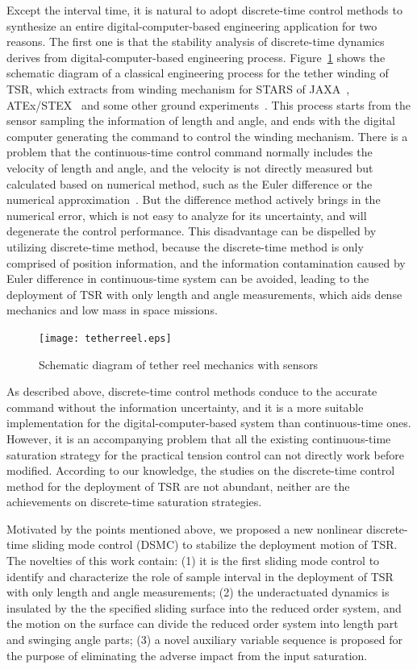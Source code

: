 \documentclass[10pt,onecolumn,draftcls]{IEEEtran}
\begin{document}
Except the interval time, it is natural to adopt discrete-time control methods to synthesize an entire digital-computer-based engineering application for two reasons. The first one is that the stability analysis of discrete-time dynamics derives from digital-computer-based engineering process. Figure~\ref{fig:tetherreel} shows the schematic diagram of a classical engineering process for the tether winding of TSR, which extracts from winding mechanism for STARS of JAXA~\cite{Nohmi2009}, ATEx/STEX~\cite{Gates2001} and some other ground experiments~\cite{Iki2014,Nakaya2004}. This process starts from the sensor sampling the information of length and angle, and ends with the digital computer generating the command to control the winding mechanism. There is a problem that the continuous-time control command normally includes the velocity of length and angle,  and the velocity is not directly measured but calculated based on numerical method, such as the Euler difference or the numerical approximation~\cite{Kang2018}. But the difference method actively brings in the numerical error, which is not easy to analyze for its uncertainty, and will degenerate the control performance. 
This disadvantage can be dispelled by utilizing discrete-time method, because the discrete-time method is only comprised of position information, and the information contamination caused by Euler difference in continuous-time system can be avoided, leading to the deployment of TSR with only length and angle measurements, which aids dense mechanics and low mass in space missions. 
\begin{figure}[htbp]  
	\centering
\texttt{[image: tetherreel.eps]}
\caption{Schematic diagram of tether reel mechanics with sensors} \label{fig:tetherreel}
\end{figure}  

As described above, discrete-time control methods conduce to the accurate command without the information uncertainty, and it is a more suitable implementation for the digital-computer-based system than continuous-time ones. However, it is an accompanying problem that all the existing continuous-time saturation strategy for the practical tension control can not directly work before modified. According to our knowledge, the studies on the discrete-time control method for the deployment of TSR are not abundant, neither are the achievements on discrete-time saturation strategies. 

Motivated by the points mentioned above, we proposed a new nonlinear discrete-time sliding mode control (DSMC) to stabilize the deployment motion of TSR. The novelties of this work contain: 
(1) it is the first sliding mode control to identify and characterize the role of sample interval in the deployment of TSR with only length and angle measurements; (2) the underactuated dynamics is insulated by the the specified sliding surface into the reduced order system, and the motion on the surface can divide the reduced order system into length part and swinging angle parts; (3) a novel auxiliary variable sequence is proposed for the purpose of eliminating the adverse impact from the input saturation.  
\end{document}
